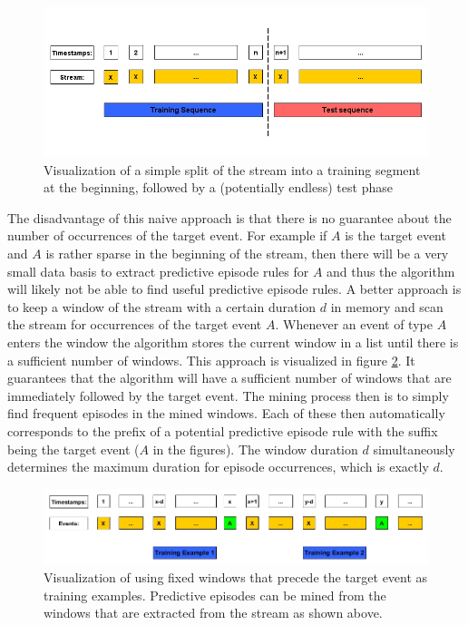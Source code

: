 \begin{figure}[h]
	\centering
  	\includegraphics[width=\textwidth]{trainingDataNaive}
	\caption{Visualization of a simple split of the stream into a training segment at the beginning, followed by a (potentially endless) test phase}
	\label{fig_trainingDataNaive}
\end{figure}

The disadvantage of this naive approach is that there is no guarantee about the number of occurrences of the target event. For example if $A$ is the target event and $A$ is rather sparse in the beginning of the stream, then there will be a very small data basis to extract predictive episode rules for $A$ and thus the algorithm will likely not be able to find useful predictive episode rules. 
A better approach is to keep a window of the stream with a certain duration $d$ in memory and scan the stream for occurrences of the target event $A$. Whenever an event of type $A$ enters the window the algorithm stores the current window in a list until there is a sufficient number of windows. This approach is visualized in figure \ref{fig_trainingDataWindowsOfA}. It guarantees that the algorithm will have a sufficient number of windows that are immediately followed by the target event. The mining process then is to simply find frequent episodes in the mined windows. Each of these then automatically corresponds to the prefix of a potential predictive episode rule with the suffix being the target event ($A$ in the figures). The window duration $d$ simultaneously determines the maximum duration for episode occurrences, which is exactly $d$.

\begin{figure}[h]
	\centering
  	\includegraphics[width=\textwidth]{trainingDataWindowsOfA}
	\caption{Visualization of using fixed windows that precede the target event as training examples. Predictive episodes can be mined from the windows that are extracted from the stream as shown above.}
	\label{fig_trainingDataWindowsOfA}
\end{figure}

